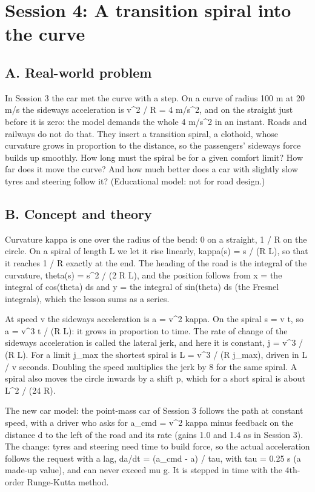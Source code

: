 \documentclass[11pt,a4paper]{article}
\begin{document}
\section{Session 4: A transition spiral into the curve}

\subsection*{A. Real-world problem}
In Session 3 the car met the curve with a step. On a curve of radius 100 m at 20 m/s the sideways acceleration is v\textasciicircum{}2 / R = 4 m/s\textasciicircum{}2, and on the straight just before it is zero: the model demands the whole 4 m/s\textasciicircum{}2 in an instant. Roads and railways do not do that. They insert a transition spiral, a clothoid, whose curvature grows in proportion to the distance, so the passengers' sideways force builds up smoothly. How long must the spiral be for a given comfort limit? How far does it move the curve? And how much better does a car with slightly slow tyres and steering follow it? (Educational model: not for road design.)

\subsection*{B. Concept and theory}
Curvature kappa is one over the radius of the bend: 0 on a straight, 1 / R on the circle. On a spiral of length L we let it rise linearly, kappa(s) = s / (R L), so that it reaches 1 / R exactly at the end. The heading of the road is the integral of the curvature, theta(s) = s\textasciicircum{}2 / (2 R L), and the position follows from x = the integral of cos(theta) ds and y = the integral of sin(theta) ds (the Fresnel integrals), which the lesson sums as a series.

At speed v the sideways acceleration is a = v\textasciicircum{}2 kappa. On the spiral s = v t, so a = v\textasciicircum{}3 t / (R L): it grows in proportion to time. The rate of change of the sideways acceleration is called the lateral jerk, and here it is constant, j = v\textasciicircum{}3 / (R L). For a limit j\_max the shortest spiral is L = v\textasciicircum{}3 / (R j\_max), driven in L / v seconds. Doubling the speed multiplies the jerk by 8 for the same spiral. A spiral also moves the circle inwards by a shift p, which for a short spiral is about L\textasciicircum{}2 / (24 R).

The new car model: the point-mass car of Session 3 follows the path at constant speed, with a driver who asks for a\_cmd = v\textasciicircum{}2 kappa minus feedback on the distance d to the left of the road and its rate (gains 1.0 and 1.4 as in Session 3). The change: tyres and steering need time to build force, so the actual acceleration follows the request with a lag, da/dt = (a\_cmd - a) / tau, with tau = 0.25 s (a made-up value), and can never exceed mu g. It is stepped in time with the 4th-order Runge-Kutta method.
\end{document}
